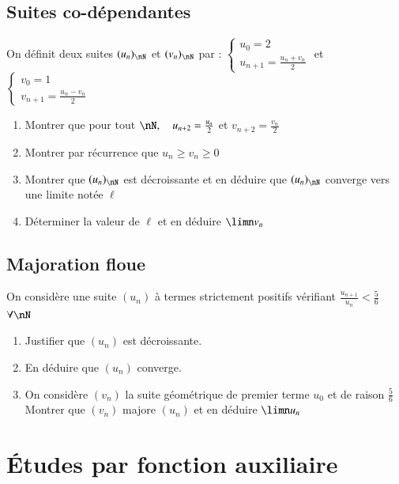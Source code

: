 \documentclass[oneside,12pt]{article}          %
\begin{document}
\subsection{Suites co-dépendantes}
On définit deux suites $(u_n)_{\nN}$ et $(v_n)_{\nN}$ par : $\begin{cases}u_0=2\\u_{n+1}=\frac{u_n+v_n}{2}\end{cases}$ et $\begin{cases}v_0=1\\v_{n+1}=\frac{u_n-v_n}{2}\end{cases}$
\begin{enumerate}
    \item Montrer que pour tout $\nN,\quad u_{n+2}=\frac{u_n}{2}$ et $v_{n+2}=\frac{v_n}{2}$
    \item Montrer par récurrence que $u_n\geq v_n\geq0$
    \item Montrer que $(u_n)_{\nN}$ est décroissante et en déduire que $(u_n)_{\nN}$ converge vers une limite notée $\ell$
    \item Déterminer la valeur de $\ell$ et en déduire $\limn v_n$
\end{enumerate}



\subsection{Majoration floue}
On considère une suite $(u_n)$ à termes strictement positifs vérifiant $\frac{u_{n+1}}{u_n}<\frac{5}{6}$ \quad $\forall\nN$
\begin{enumerate}
	\item Justifier que $(u_n)$ est décroissante.
	\item En déduire que $(u_n)$ converge.
	\item On considère $(v_n)$ la suite géométrique de premier terme $u_0$ et de raison $\frac{5}{6}$\\
	Montrer que $(v_n)$ majore $(u_n)$ et en déduire $\limn u_n$
\end{enumerate}



\section{Études par fonction auxiliaire}
\end{document}
